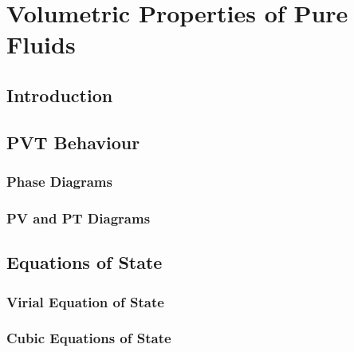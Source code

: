 
\chapter{Volumetric Properties of Pure Fluids}\label{chp2}


\section{Introduction}\label{chap2:Introduction}



\section{PVT Behaviour}\label{chp2:PVTBehaviour}


\subsection{Phase Diagrams}\label{chp2:PhaseDiagram}

\subsection{PV and PT Diagrams}\label{chp2:PVPTDiagram}

\section{Equations of State}\label{chp2:EOS}


\subsection{Virial Equation of State}\label{chp2:VirialEOS}

\subsection{Cubic Equations of State}\label{chp2:CubicEOS}



